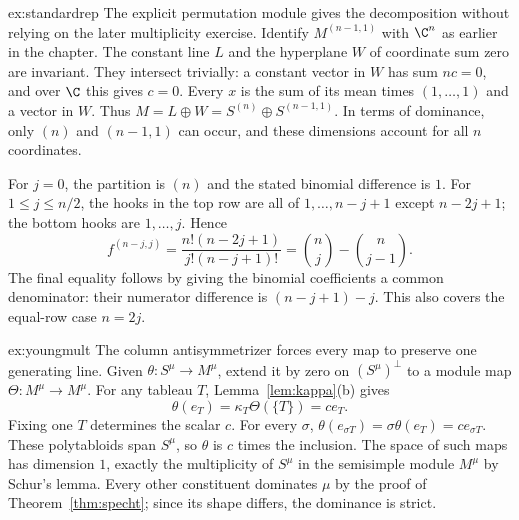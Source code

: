 \begin{solution}{ex:standardrep}
\idea The explicit permutation module gives the decomposition without relying on the later multiplicity exercise.
\writeup Identify $M^{(n-1,1)}$ with $\C^n$ as earlier in the chapter. The constant line $L$ and the hyperplane $W$ of coordinate sum zero are invariant. They intersect trivially: a constant vector in $W$ has sum $nc=0$, and over $\C$ this gives $c=0$. Every $x$ is the sum of its mean times $(1,\ldots,1)$ and a vector in $W$. Thus $M=L\oplus W=S^{(n)}\oplus S^{(n-1,1)}$. In terms of dominance, only $(n)$ and $(n-1,1)$ can occur, and these dimensions account for all $n$ coordinates.

For $j=0$, the partition is $(n)$ and the stated binomial difference is $1$. For $1\le j\le n/2$, the hooks in the top row are all of $1,\ldots,n-j+1$ except $n-2j+1$; the bottom hooks are $1,\ldots,j$. Hence
\[
f^{(n-j,j)}
=\frac{n!(n-2j+1)}{j!(n-j+1)!}
=\binom nj-\binom n{j-1}.
\]
The final equality follows by giving the binomial coefficients a common denominator: their numerator difference is $(n-j+1)-j$. This also covers the equal-row case $n=2j$.
\end{solution}

\begin{solution}{ex:youngmult}
\idea The column antisymmetrizer forces every map to preserve one generating line.
\writeup Given $\theta:S^\mu\to M^\mu$, extend it by zero on $(S^\mu)^\perp$ to a module map $\Theta:M^\mu\to M^\mu$. For any tableau $T$, Lemma~\ref{lem:kappa}(b) gives
\[
\theta(e_T)=\kappa_T\Theta(\{T\})=c e_T.
\]
Fixing one $T$ determines the scalar $c$. For every $\sigma$,
$\theta(e_{\sigma T})=\sigma\theta(e_T)=c e_{\sigma T}$.
These polytabloids span $S^\mu$, so $\theta$ is $c$ times the inclusion. The space of such maps has dimension $1$, exactly the multiplicity of $S^\mu$ in the semisimple module $M^\mu$ by Schur's lemma. Every other constituent dominates $\mu$ by the proof of Theorem~\ref{thm:specht}; since its shape differs, the dominance is strict.
\end{solution}


